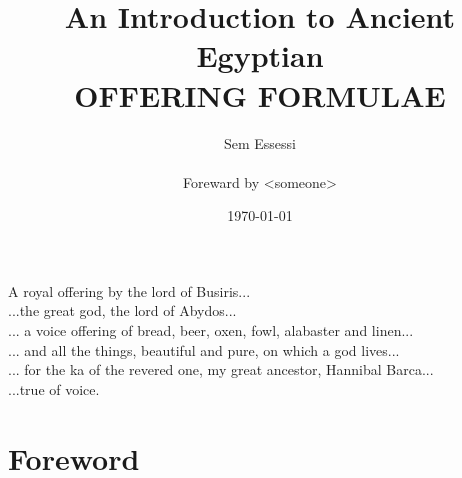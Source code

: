 \documentclass[a4paper,pagesize,8pt,pointlessnumbers,normalheadings]{book}
\title{
	\Large An Introduction to Ancient Egyptian\\
	\Huge \textbf{OFFERING FORMULAE}}
\author{Sem Essessi\\\\Foreward by <someone>}
\date{\today}
\begin{document}
\maketitle

\clearpage
\vspace*{\fill}
\clearpage


\clearpage
\vspace*{\fill}
\clearpage

\vspace*{\fill}
\begin{center}
A royal offering by  the lord of Busiris...\\
...the great god, the lord of Abydos...\\
\vspace{7.5mm}
... a voice offering of bread, beer, oxen, fowl, alabaster and linen...\\
... and all the things, beautiful and pure, on which a god lives...\\
\vspace{15mm}
... for the ka of the revered one, my great ancestor, Hannibal Barca...\\
...true of voice.\\
\end{center}
\vspace*{\fill}

\tableofcontents

\markboth{}{}

\newlength\q
\setlength{}

\chapter*{Foreword}

\markboth{}{}
\end{document}
